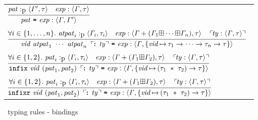 \documentclass[final]{article}
\begin{document}
\begin{figure}[t]
\begin{small}
\begin{center}
  \begin{tabular}{llll}
    \multicolumn{4}{l}{
      $\MEMinferc
      {\MEMtyping{\CONSbindpat{\METApat}{\METAexp}}{\METAityenv}{\METAityenv'}}
      {\MEMtypingpat{\METApat}{\METAityenv'}{\METAity}}
      {\MEMtyping{\METAexp}{\METAityenv}{\METAity}}$
    }

    \\
    &&&
    \\

    \multicolumn{4}{l}{
      $\MEMinferd
      {\MEMtyping{\CONSbindappopty{\METAvid}{\CONSparamn{\METAatpat_1}{\METAatpat_n}}{\METAty}{\METAexp}}{\METAityenv}{\{\asgn{\METAvid}{\CONSarrowty{\METAity_1}{\CONSarrowty{\cdots}{\CONSarrowty{\METAity_n}{\METAity}}}}\}}}
      {\forallexp{i\in\{1,\dots,n\}}{\MEMtypingpat{\METAatpat_i}{\METAityenv_i}{\METAity_i}}}
      {\MEMtyping{\METAexp}{\MEMplusenv{\METAityenv}{(\MEMequnion{\METAityenv_1}{\MEMequnion{\cdots}{\METAityenv_n}})}}{\METAity}}
      {\CONSop{\MEMtyping{\METAty}{\METAityenv}{\METAity}}}$
    }

    \\
    &&&
    \\

    \multicolumn{4}{l}{
      $\MEMinferd
      {\MEMtyping{\CONSbindinfixopty{\METAvid}{\METApat_1}{\METApat_2}{\METAty}{\METAexp}}{\METAityenv}{\{\asgn{\METAvid}{\CONSarrowty{(\CONStupty{\METAity_1}{\METAity_2})}{\METAity}}\}}}
      {\forallexp{i\in\{1,2\}}{\MEMtypingpat{\METApat_i}{\METAityenv_i}{\METAity_i}}}
      {\MEMtyping{\METAexp}{\MEMplusenv{\METAityenv}{(\MEMequnion{\METAityenv_1}{\METAityenv_2})}}{\METAity}}
      {\CONSop{\MEMtyping{\METAty}{\METAityenv}{\METAity}}}$
    }

    \\
    &&&
    \\

    \multicolumn{4}{l}{
      $\MEMinferd
      {\MEMtyping{\CONSbindinfixropty{\METAvid}{\METApat_1}{\METApat_2}{\METAty}{\METAexp}}{\METAityenv}{\{\asgn{\METAvid}{\CONSarrowty{(\CONStupty{\METAity_1}{\METAity_2})}{\METAity}}\}}}
      {\forallexp{i\in\{1,2\}}{\MEMtypingpat{\METApat_i}{\METAityenv_i}{\METAity_i}}}
      {\MEMtyping{\METAexp}{\MEMplusenv{\METAityenv}{(\MEMequnion{\METAityenv_1}{\METAityenv_2})}}{\METAity}}
      {\CONSop{\MEMtyping{\METAty}{\METAityenv}{\METAity}}}$
    }
  \end{tabular}
\end{center}
\caption{\eml\ typing rules - bindings}
\label{fig:typing-rules-bindings}
\end{small}
\end{figure}
\end{document}
